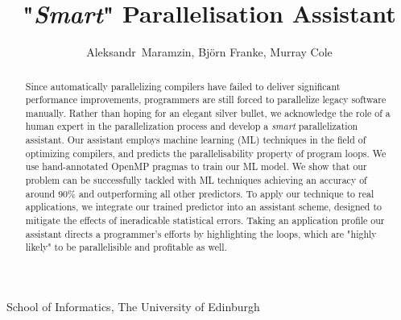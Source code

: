 \documentclass{acaces}
\begin{document}
\title{"\textit{Smart}" Parallelisation Assistant}

\author{
Aleksandr~Maramzin,
Bj\"{o}rn Franke,
Murray Cole
}

\address{1}{
School of Informatics,
The University of Edinburgh
}


\pagestyle{empty}

\begin{abstract}
\null\quad Since automatically parallelizing compilers have failed to deliver significant performance improvements, programmers are still forced to parallelize legacy software manually. Rather than hoping for an elegant silver bullet, we acknowledge the role of a human expert in the parallelization process and develop a \textit{smart} parallelization assistant.\newline\null
\quad Our assistant employs machine learning (ML) techniques in the field of optimizing compilers, and predicts the parallelisability property of program loops. We use hand-annotated OpenMP pragmas to train our ML model. We show that our problem can be successfully tackled with ML techniques achieving an accuracy of around 90\% and outperforming all other predictors.\newline\null
\quad To apply our technique to real applications, we integrate our trained predictor into an assistant scheme, designed to mitigate the effects of ineradicable statistical errors. Taking an application profile our assistant directs a programmer's efforts by highlighting the loops, which are "highly likely" to be parallelisible and profitable as well.
\end{abstract}

\end{document}
